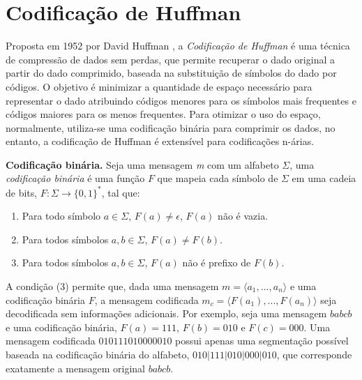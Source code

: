 


\section{Codificação de Huffman}

Proposta em 1952 por David Huffman \cite{huffman1952}, a \textit{Codificação de Huffman} é uma técnica de compressão de dados sem perdas, que permite recuperar o dado original a partir do dado comprimido, baseada na substituição de símbolos do dado por códigos. O objetivo é minimizar a quantidade de espaço necessário para representar o dado atribuindo códigos menores para os símbolos mais frequentes e códigos maiores para os menos frequentes. Para otimizar o uso do espaço, normalmente, utiliza-se uma codificação binária para comprimir os dados, no entanto, a codificação de Huffman é extensível para codificações n-árias. 

\theoremstyle{definition}
\begin{definition}{\textbf{Codificação binária.}}
Seja uma mensagem \textit{m} com um alfabeto $\Sigma$, uma \textit{codificação binária} é uma função $F$ que mapeia cada símbolo de $\Sigma$ em uma cadeia de bits, $F: \Sigma \rightarrow \{0, 1\}^*$, tal que:

\begin{enumerate}
    \item Para todo símbolo $a \in \Sigma$, $F(a) \neq \epsilon$, $F(a)$ não é vazia.
    \item Para todos símbolos $a, b \in \Sigma$, $F(a) \neq F(b)$.
    \item Para todos símbolos $a, b \in \Sigma$, $F(a)$ não é prefixo de $F(b)$.
\end{enumerate}
\end{definition}

A condição (3) permite que, dada uma mensagem $m = \langle a_1, ..., a_n \rangle$ e uma codificação binária $F$, a mensagem codificada $m_c = \langle F(a_1), ..., F(a_n) \rangle$ seja decodificada sem informações adicionais. Por exemplo, seja uma mensagem $babcb$ e uma codificação binária, $F(a) = 111$, $F(b) = 010$ e $F(c) = 000$. Uma mensagem codificada $010111010000010$ possui apenas uma segmentação possível baseada na codificação binária do alfabeto, $010|111|010|000|010$, que corresponde exatamente a mensagem original $babcb$.

